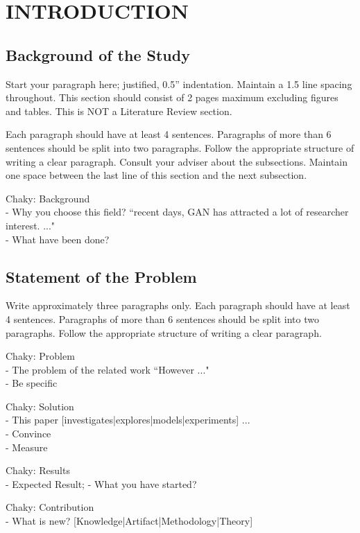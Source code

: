 \setlength{\parindent}{0.5in} 
\setlength{\parskip}{0mm}
\setlength{\baselineskip}{1.6em}

\chapter{INTRODUCTION} 

\section{Background of the Study}
Start your paragraph here; justified, 0.5” indentation. Maintain a 1.5 line spacing throughout. This section should consist of 2 pages maximum excluding figures and tables. This is NOT a Literature Review section.

Each paragraph should have at least 4 sentences. Paragraphs of more than 6 sentences should be split into two paragraphs. Follow the appropriate structure of writing a clear paragraph.  Consult your adviser about the subsections. Maintain one space between the last line of this section and the next subsection.

Chaky: Background \\
- Why you choose  this field? ``recent days, GAN has attracted a lot of researcher interest. ..."\\
- What have been done?

\section{Statement of the Problem}
Write approximately three paragraphs only. Each paragraph should have at least 4 sentences. Paragraphs of more than 6 sentences should be split into two paragraphs. Follow the appropriate structure of writing a clear paragraph.

Chaky: Problem \\
- The problem of the related work ``However ..."\\
- Be specific

Chaky: Solution \\
- This paper [investigates|explores|models|experiments] ...\\
- Convince\\
- Measure

Chaky: Results \\
- Expected Result;
- What you have started?

Chaky: Contribution  \\
- What is new? [Knowledge|Artifact|Methodology|Theory]


